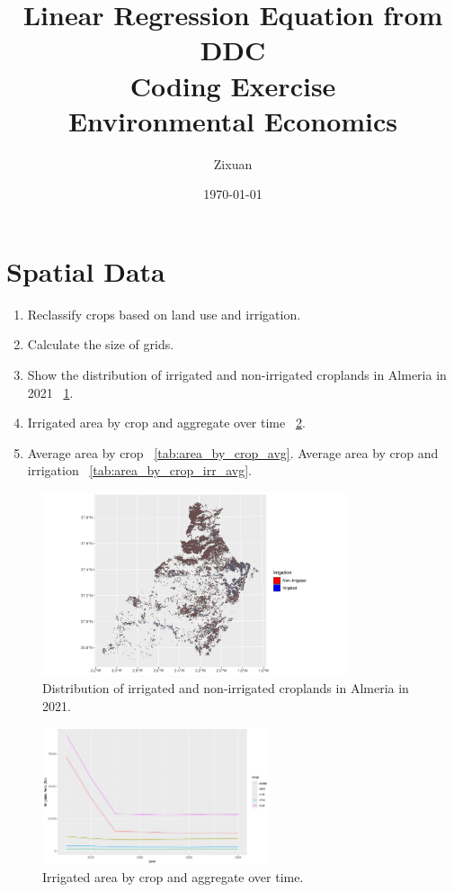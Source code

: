 \documentclass[12pt]{article}[margin=1in]
\title{\textbf{Linear Regression Equation from DDC} \\
\vspace{.3cm}
\large Coding Exercise \\
Environmental Economics}
\author{Zixuan}
\date{\today}
\begin{document}
\maketitle

\section{Spatial Data}

\begin{enumerate}
    \item Reclassify crops based on land use and irrigation.
    \item Calculate the size of grids.
    \item Show the distribution of irrigated and non-irrigated croplands in Almeria in 2021 ~\ref{fig:land_use_distribution_almeria_2021}.
    \item Irrigated area by crop and aggregate over time ~\ref{fig:irrigated_area_by_crop_over_time}.
    \item Average area by crop ~\ref{tab:area_by_crop_avg}. Average area by crop and irrigation ~\ref{tab:area_by_crop_irr_avg}.
\end{enumerate}


\begin{figure}[!htbp]
    \centering
    \includegraphics[width=0.8\textwidth]{../Figures/land_use_distribution_almeria_2021.pdf}
    \caption{Distribution of irrigated and non-irrigated croplands in Almeria in 2021.}
    \label{fig:land_use_distribution_almeria_2021}
\end{figure}

\begin{figure}[!htbp]
    \centering
    \includegraphics[width=0.6\textwidth]{../Figures/irrigated_area_by_crop_over_time.pdf}
    \caption{Irrigated area by crop and aggregate over time.}
    \label{fig:irrigated_area_by_crop_over_time}
\end{figure}
\end{document}
